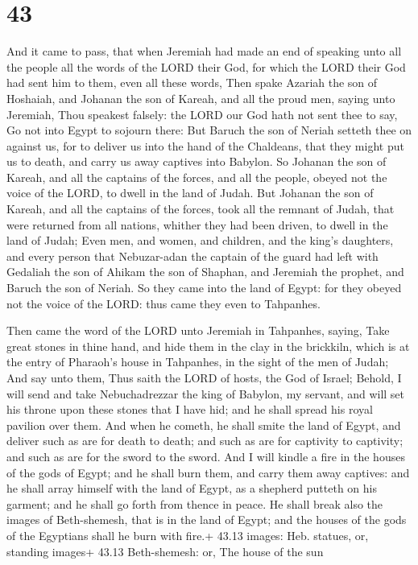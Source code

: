 \hypertarget{section-42}{%
\section{43}\label{section-42}}

 And it came to pass, that when Jeremiah had made an end of
speaking unto all the people all the words of the LORD their God, for
which the LORD their God had sent him to them, even all these words,
 Then spake Azariah the son of Hoshaiah, and Johanan the son
of Kareah, and all the proud men, saying unto Jeremiah, Thou speakest
falsely: the LORD our God hath not sent thee to say, Go not into Egypt
to sojourn there:  But Baruch the son of Neriah setteth thee
on against us, for to deliver us into the hand of the Chaldeans, that
they might put us to death, and carry us away captives into Babylon.
 So Johanan the son of Kareah, and all the captains of the
forces, and all the people, obeyed not the voice of the LORD, to dwell
in the land of Judah.  But Johanan the son of Kareah, and
all the captains of the forces, took all the remnant of Judah, that were
returned from all nations, whither they had been driven, to dwell in the
land of Judah;  Even men, and women, and children, and the
king's daughters, and every person that Nebuzar-adan the captain of the
guard had left with Gedaliah the son of Ahikam the son of Shaphan, and
Jeremiah the prophet, and Baruch the son of Neriah.  So they
came into the land of Egypt: for they obeyed not the voice of the LORD:
thus came they even to Tahpanhes.

 Then came the word of the LORD unto Jeremiah in
Tahpanhes, saying,  Take great stones in thine hand, and
hide them in the clay in the brickkiln, which is at the entry of
Pharaoh's house in Tahpanhes, in the sight of the men of Judah;
 And say unto them, Thus saith the LORD of hosts, the God
of Israel; Behold, I will send and take Nebuchadrezzar the king of
Babylon, my servant, and will set his throne upon these stones that I
have hid; and he shall spread his royal pavilion over them.
 And when he cometh, he shall smite the land of Egypt, and
deliver such as are for death to death; and such as are for captivity to
captivity; and such as are for the sword to the sword.  And
I will kindle a fire in the houses of the gods of Egypt; and he shall
burn them, and carry them away captives: and he shall array himself with
the land of Egypt, as a shepherd putteth on his garment; and he shall go
forth from thence in peace.  He shall break also the images
of Beth-shemesh, that is in the land of Egypt; and the houses of the
gods of the Egyptians shall he burn with fire.+ 43.13 images: Heb.
statues, or, standing images+ 43.13 Beth-shemesh: or, The house of the
sun

